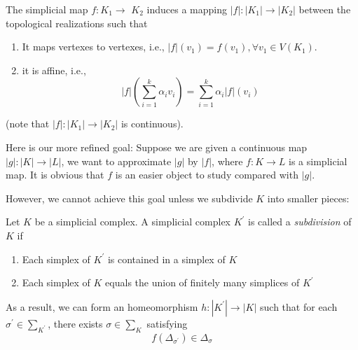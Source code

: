 \begin{definition}  The simplicial map \(f : {K}_{1} \rightarrow\)  \({K}_{2}\) induces a mapping \(\left| f\right|  : \left| {K}_{1}\right|  \rightarrow  \left| {K}_{2}\right|\) between the topological realizations such that

\begin{enumerate}
    \item It maps vertexes to vertexes, i.e., \(\left| f\right| \left( {v}_{1}\right)  = f\left( {v}_{1}\right), \forall {v}_{1} \in  V\left( {K}_{1}\right)\).

\item it is affine, i.e., 
\[
\left| f\right| \left( {\mathop{\sum }\limits_{{i = 1}}^{k}{\alpha }_{i}{v}_{i}}\right)  = \mathop{\sum }\limits_{{i = 1}}^{k}{\alpha }_{i}\left| f\right| \left( {v}_{i}\right)
\]
\end{enumerate}
(note that \(\left| f\right|  : \left| {K}_{1}\right|  \rightarrow  \left| {K}_{2}\right|\) is continuous).
\end{definition}

Here is our more refined goal: Suppose we are given a continuous map \(\left| g\right|  : \left| K\right|  \rightarrow  \left| L\right|\), we want to approximate \(\left| g\right|\) by \(\left| f\right|\), where \(f : K \rightarrow  L\) is a simplicial map. It is obvious that \(f\) is an easier object to study compared with \(\left| g\right|\).

However, we cannot achieve this goal unless we subdivide \(K\) into smaller pieces:

\begin{definition} [Subdivision] Let \(K\) be a simplicial complex. A simplicial complex \({K}^{\prime }\) is called a \emph{subdivision} of \(K\) if

\begin{enumerate}
    \item Each simplex of \({K}^{\prime }\) is contained in a simplex of \(K\)

\item Each simplex of \(K\) equals the union of finitely many simplices of \({K}^{\prime }\)
\end{enumerate} 
As a result, we can form an homeomorphism \(h : \left| {K}^{\prime }\right|  \rightarrow  \left| K\right|\) such that for each \({\sigma }^{\prime } \in  {\sum }_{{K}^{\prime }}\), there exists \(\sigma  \in  {\sum }_{K}\) satisfying
\[
f\left( {\Delta }_{{\sigma }^{\prime }}\right)  \in  {\Delta }_{\sigma }
\]
\end{definition}

